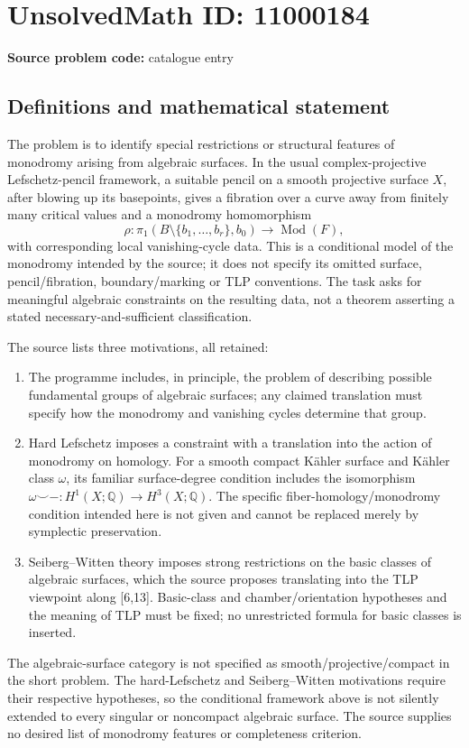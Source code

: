\documentclass[11pt]{article}
\newcommand{\Q}{\mathbb{Q}}
\begin{document}
\section*{UnsolvedMath ID: 11000184}
\textbf{Source problem code:} catalogue entry
\subsection{Definitions and mathematical statement}
The problem is to identify special restrictions or structural features of monodromy arising from algebraic surfaces. In the usual complex-projective Lefschetz-pencil framework, a suitable pencil on a smooth projective surface \(X\), after blowing up its basepoints, gives a fibration over a curve away from finitely many critical values and a monodromy homomorphism
\[\rho:\pi_1(B\setminus\{b_1,\ldots,b_r\},b_0)\to\operatorname{Mod}(F),\]
with corresponding local vanishing-cycle data. This is a conditional model of the monodromy intended by the source; it does not specify its omitted surface, pencil/fibration, boundary/marking or TLP conventions. The task asks for meaningful algebraic constraints on the resulting data, not a theorem asserting a stated necessary-and-sufficient classification.

The source lists three motivations, all retained:
\begin{enumerate}
\item The programme includes, in principle, the problem of describing possible fundamental groups of algebraic surfaces; any claimed translation must specify how the monodromy and vanishing cycles determine that group.
\item Hard Lefschetz imposes a constraint with a translation into the action of monodromy on homology. For a smooth compact K\"ahler surface and K\"ahler class \(\omega\), its familiar surface-degree condition includes the isomorphism \(\omega\smile-:H^1(X;\Q)\to H^3(X;\Q)\). The specific fiber-homology/monodromy condition intended here is not given and cannot be replaced merely by symplectic preservation.
\item Seiberg--Witten theory imposes strong restrictions on the basic classes of algebraic surfaces, which the source proposes translating into the TLP viewpoint along [6,13]. Basic-class and chamber/orientation hypotheses and the meaning of TLP must be fixed; no unrestricted formula for basic classes is inserted.
\end{enumerate}
The algebraic-surface category is not specified as smooth/projective/compact in the short problem. The hard-Lefschetz and Seiberg--Witten motivations require their respective hypotheses, so the conditional framework above is not silently extended to every singular or noncompact algebraic surface. The source supplies no desired list of monodromy features or completeness criterion.
\end{document}
